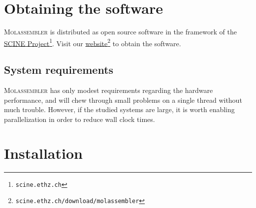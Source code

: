\documentclass[]{tufte-book}
\begin{document}
\chapter{Obtaining the software}\label{ch:obtain}

\textsc{Molassembler}  is distributed as open source software in the framework
of the \href{https://scine.ethz.ch/}{SCINE
Project}\footnote{\texttt{scine.ethz.ch}}.
Visit our 
\href{https://scine.ethz.ch/download/molassembler}{website}\footnote{\texttt{scine.ethz.ch/download/molassembler}}
to obtain the software. 


\section{System requirements}

\textsc{Molassembler} has only modest requirements regarding the hardware
performance, and will chew through small problems on a single thread without
much trouble. However, if the studied systems are large, it is worth enabling
parallelization in order to reduce wall clock times.


\chapter{Installation}\label{ch:installation}

% 
% 
% 
% 
% 
\end{document}
